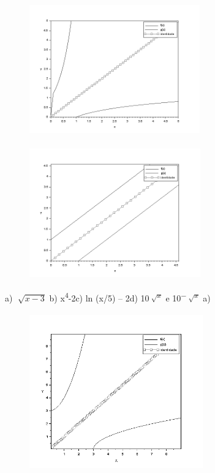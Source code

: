 \begin{respostas}{6}
    \begin{figure}[H]
	    \begin{Center}
		    \includegraphics[width=2.9in,height=2.26in]{capitulos/logaritmos_e_funcao_logaritmica/media/image15.png}
	    \end{Center}
    \end{figure}

    \begin{figure}[H]
	    \begin{Center}
		    \includegraphics[width=2.91in,height=2.24in]{capitulos/logaritmos_e_funcao_logaritmica/media/image16.png}
	    \end{Center}
    \end{figure}

	\ansitem{}

	\ansitem{} a)  \( \sqrt[]{x-3} \) \quad b) x\textsuperscript{4}-2\quad \quad c) ln (x/5) – 2\quad d) 
 10\textsuperscript{\(\sqrt[]{x} \)} e 10\textsuperscript{\(- \sqrt[]{x} \)}  
    \ansitem{} a) 

    \begin{figure}[H]
	    \begin{Center}
	    	\includegraphics[width=2.95in,height=2.68in]{capitulos/logaritmos_e_funcao_logaritmica/media/image17.png}
	    \end{Center}
    \end{figure}


\end{respostas}
